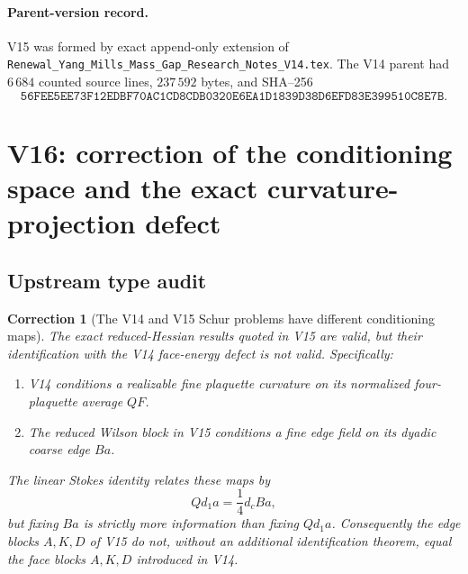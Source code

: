 \documentclass[11pt,oneside]{book}
\newtheorem{correction}[theorem]{Correction}
\theoremstyle{definition}
\theoremstyle{remark}
\begin{document}
\paragraph{Parent-version record.}
V15 was formed by exact append-only extension of
\texttt{Renewal\_Yang\_Mills\_Mass\_Gap\_Research\_Notes\_V14.tex}.
The V14 parent had \(6\,684\) counted source lines,
\(237\,592\) bytes, and SHA--256
\[
\texttt{56FEE5EE73F12EDBF70AC1CD8CDB0320E6EA1D1839D38D6EFD83E399510C8E7B}.
\]



\section{V16: correction of the conditioning space and the exact
curvature-projection defect}
\label{sec:e8v16}

\subsection{Upstream type audit}

\begin{correction}[The V14 and V15 Schur problems have different
conditioning maps]
\label{corr:e8v16-type}
The exact reduced-Hessian results quoted in V15 are valid, but their
identification with the V14 face-energy defect is not valid.
Specifically:
\begin{enumerate}
\item V14 conditions a realizable fine plaquette curvature on its
normalized four-plaquette average \(QF\).
\item The reduced Wilson block in V15 conditions a fine edge field
on its dyadic coarse edge \(Ba\).
\end{enumerate}
The linear Stokes identity relates these maps by
\[
             Qd_1a=\frac14d_cBa,                  \tag{16.1}
\]
but fixing \(Ba\) is strictly more information than fixing \(Qd_1a\).
Consequently the edge blocks \(A,K,D\) of V15 do not, without an
additional identification theorem, equal the face blocks \(A,K,D\)
introduced in V14.
\end{correction}
\end{document}
